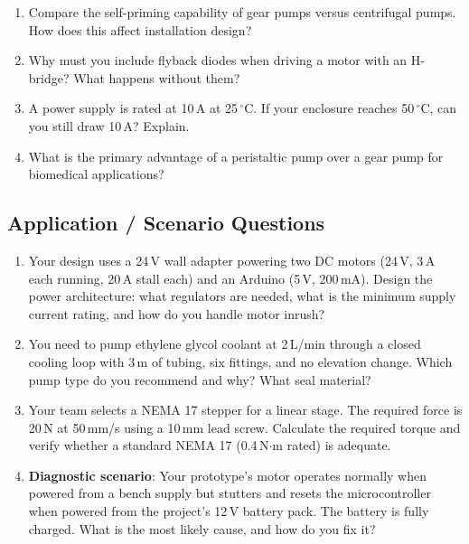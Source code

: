 \begin{enumerate}[leftmargin=1.5em]
  \item Compare the self-priming capability of gear pumps versus centrifugal pumps. How does this affect installation design?

  \item Why must you include flyback diodes when driving a motor with an H-bridge? What happens without them?

  \item A power supply is rated at 10\,A at 25\,$^{\circ}$C. If your enclosure reaches 50\,$^{\circ}$C, can you still draw 10\,A? Explain.

  \item What is the primary advantage of a peristaltic pump over a gear pump for biomedical applications?
\end{enumerate}

\subsection{Application / Scenario Questions}

\begin{enumerate}[resume,leftmargin=1.5em]
  \item Your design uses a 24\,V wall adapter powering two DC motors (24\,V, 3\,A each running, 20\,A stall each) and an Arduino (5\,V, 200\,mA). Design the power architecture: what regulators are needed, what is the minimum supply current rating, and how do you handle motor inrush?

  \item You need to pump ethylene glycol coolant at 2\,L/min through a closed cooling loop with 3\,m of tubing, six fittings, and no elevation change. Which pump type do you recommend and why? What seal material?

  \item Your team selects a NEMA 17 stepper for a linear stage. The required force is 20\,N at 50\,mm/s using a 10\,mm lead screw. Calculate the required torque and verify whether a standard NEMA 17 (0.4\,N$\cdot$m rated) is adequate.

  \item \textbf{Diagnostic scenario}: Your prototype's motor operates normally when powered from a bench supply but stutters and resets the microcontroller when powered from the project's 12\,V battery pack. The battery is fully charged. What is the most likely cause, and how do you fix it?
\end{enumerate}

